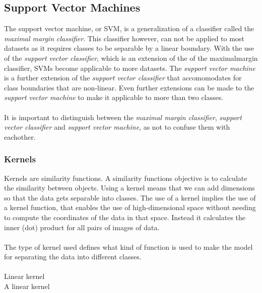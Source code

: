 \documentclass[11pt]{article}
\begin{document}
\subsection{Support Vector Machines}
The support vector machine, or SVM, is a generalization of a classifier called the \textit{maximal margin classifier}. This classifier however, can not be applied to most datasets as it requires classes to be separable by a linear boundary. With the use of the \textit{support vector classifier}, which is an extension of the of the maximalmargin classifier, SVMs become applicable to more datasets. The \textit{support vector machine} is a further extension of the \textit{support vector classifier} that accomomodates for class boundaries that are non-linear. Even further extensions can be made to the \textit{support vector machine} to make it applicable to more than two classes.\cite{jamesSupportVectorMachines}\\
\\
It is important to distinguish between the \textit{maximal margin classifier}, \textit{support vector classifier} and \textit{support vector machine}, as not to confuse them with eachother.\cite{jamesSupportVectorMachines}

\subsubsection{Kernels}
Kernels are similarity functions. A similarity functions objective is to calculate the similarity between objects. Using a kernel means that we can add dimensions so that the data gets separable into classes. The use of a kernel implies the use of a kernel function, that enables the use of high-dimensional space without needing to compute the coordinates of the data in that space. Instead it calculates the inner (dot) product for all pairs of images of data.\cite{KernelMethod2021}\\
\\
The type of kernel used defines what kind of function is used to make the model for separating the data into different classes.\cite{SVMKernelsScikitlearn24}\\
\\
\large{Linear kernel}\\
A linear kernel
\end{document}
